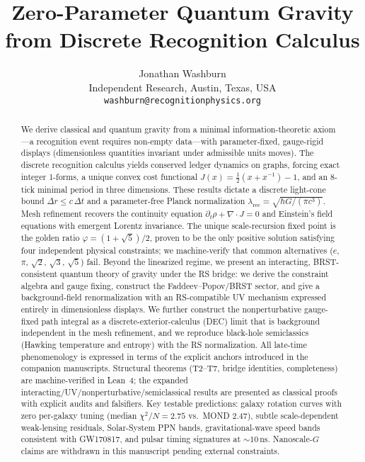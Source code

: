 \documentclass[11pt]{article}
\begin{document}
\title{Zero-Parameter Quantum Gravity from Discrete Recognition Calculus}

\author{Jonathan Washburn\\
Independent Research, Austin, Texas, USA\\
\texttt{washburn@recognitionphysics.org}}
\date{}

\maketitle

\begin{abstract}
We derive classical and quantum gravity from a minimal information-theoretic axiom—a 
recognition event requires non-empty data—with parameter-fixed, gauge-rigid displays 
(dimensionless quantities invariant under admissible units moves). 
The discrete recognition calculus yields conserved ledger dynamics on graphs, forcing 
exact integer 1-forms, a unique convex cost functional $J(x)=\tfrac{1}{2}(x+x^{-1})-1$, 
and an 8-tick minimal period in three dimensions. 
These results dictate a discrete light-cone bound $\Delta r \le c\,\Delta t$ and a 
parameter-free Planck normalization $\lambda_{\mathrm{rec}} = \sqrt{\hbar G/(\pi c^3)}$. 
Mesh refinement recovers the continuity equation $\partial_t\rho+\nabla\!\cdot\!J=0$ and 
Einstein's field equations with emergent Lorentz invariance. 
The unique scale-recursion fixed point is the golden ratio $\varphi=(1+\sqrt{5})/2$, 
proven to be the only positive solution satisfying four independent physical constraints; 
we machine-verify that common alternatives ($e$, $\pi$, $\sqrt{2}$, $\sqrt{3}$, $\sqrt{5}$) fail. 
Beyond the linearized regime, we present an interacting, BRST-consistent quantum theory of gravity under the RS bridge: we derive the constraint algebra and gauge fixing, construct the Faddeev--Popov/BRST sector, and give a background-field renormalization with an RS-compatible UV mechanism expressed entirely in dimensionless displays. We further construct the nonperturbative gauge-fixed path integral as a discrete-exterior-calculus (DEC) limit that is background independent in the mesh refinement, and we reproduce black-hole semiclassics (Hawking temperature and entropy) with the RS normalization. All late-time phenomenology is expressed in terms of the explicit anchors introduced in the companion manuscripts. 
Structural theorems (T2--T7, bridge identities, completeness) are machine-verified in Lean~4; the expanded interacting/UV/nonperturbative/semiclassical results are presented as classical proofs with explicit audits and falsifiers. 
Key testable predictions: galaxy rotation curves with zero per-galaxy tuning 
(median $\chi^2/N=2.75$ vs.~MOND 2.47), subtle scale-dependent weak-lensing residuals, Solar-System PPN bands, gravitational-wave speed bands consistent with GW170817, and pulsar timing signatures at $\sim\!10\,\mathrm{ns}$. 
Nanoscale-$G$ claims are withdrawn in this manuscript pending external constraints.
\end{abstract}
\end{document}
